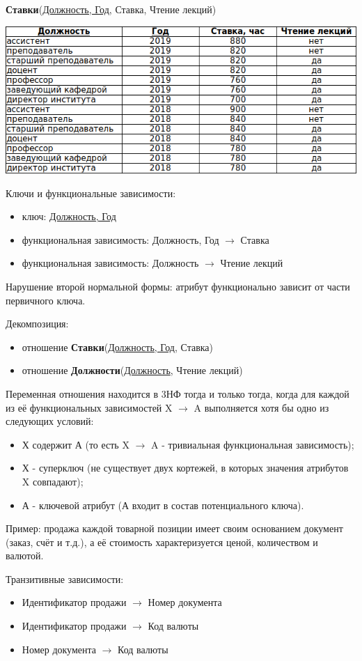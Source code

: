 \documentclass{beamer}
\begin{document}
\begin{frame}
\textbf{Ставки}(\underline{Должность, Год}, Ставка, Чтение лекций)
\begin{center}
\includegraphics[scale=1.25]{images/ex-rasp-07.png}
\end{center}
Ключи и функциональные зависимости:
\begin{itemize}
\item ключ: \underline{Должность, Год}
\item функциональная зависимость: Должность, Год $\rightarrow$ Ставка
\item функциональная зависимость: Должность $\rightarrow$ Чтение лекций
\end{itemize}
Нарушение второй нормальной формы: атрибут функционально зависит от части первичного ключа.

Декомпозиция:
\begin{itemize}
\item отношение \textbf{Ставки}(\underline{Должность, Год}, Ставка)
\item отношение \textbf{Должности}(\underline{Должность}, Чтение лекций)
\end{itemize}
\end{frame}

\begin{frame}
\begin{block}{Переменная отношения находится в 3НФ}
тогда и только тогда, когда для каждой из её функциональных зависимостей X $\rightarrow$ A выполняется хотя бы одно из следующих условий: 
\begin{itemize}
\item Х содержит А (то есть X $\rightarrow$ A - тривиальная функциональная зависимость);
\item Х - суперключ (не существует двух кортежей, в которых значения атрибутов X совпадают);
\item А - ключевой атрибут (А входит в состав потенциального ключа).
\end{itemize}
\end{block}
Пример: продажа каждой товарной позиции имеет своим основанием документ (заказ, счёт и т.д.), а её стоимость характеризуется ценой, количеством и валютой.

Транзитивные зависимости:
\begin{itemize}
\item Идентификатор продажи $\rightarrow$ Номер документа
\item Идентификатор продажи $\rightarrow$ Код валюты
\item Номер документа $\rightarrow$ Код валюты
\end{itemize}
\end{frame}
\end{document}
